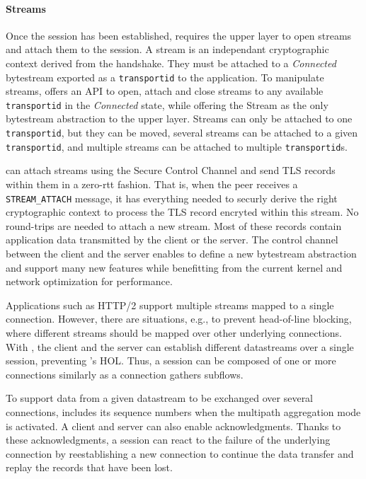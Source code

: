 \paragraph*{Streams}
Once the \tcpls session has been established, \tcpls requires the upper layer to
open streams and attach them to the session. A stream is an independant
cryptographic context derived from the \tcpls handshake. They must be attached to a
\textit{Connected} \tcp bytestream exported as a \texttt{transportid} to the
application. To manipulate streams, \tcpls offers an API to open, attach
and close streams to any available \texttt{transportid} in the \textit{Connected} state,
while offering the Stream as the only bytestream abstraction to the upper layer.
Streams can only be attached to one \texttt{transportid}, but they can be moved,
several streams can be attached to a given \texttt{transportid}, and multiple
streams can be attached to multiple \texttt{transportid}s.

\tcpls can attach streams using the Secure Control Channel and send TLS records
within them in a zero-rtt fashion. That is, when the peer receives a
\texttt{STREAM\_ATTACH} message, it has everything needed to securly derive the
right cryptographic context to process the TLS record encryted within this
stream. No round-trips are needed to attach a new stream.  Most of these records
contain application data transmitted by the client or the server.  The control
channel between the client and the server enables \tcpls to define a new
bytestream abstraction and support many new features while benefitting from the
current kernel and network optimization for \tcp performance.

Applications such as HTTP/2 support multiple streams mapped to a single \tcp
connection. However, there are situations, e.g., to prevent head-of-line
blocking, where different streams should be mapped over other underlying \tcp
connections. With \tcpls, the client and the server can establish different
datastreams over a single \tcpls session, preventing \tcp's HOL. Thus, a
\tcpls session can be composed of one or more \tcp connections similarly as a
\mptcp connection gathers subflows.

To support data from a given datastream to be exchanged over several \tcp
connections, \tcpls includes its sequence numbers when the multipath aggregation
mode is activated. A client and server can also enable acknowledgments. Thanks
to these \tcpls acknowledgments, a \tcpls session can react to the failure of
the underlying \tcp connection by reestablishing a new \tcp connection to
continue the data transfer and replay the records that have been lost.

